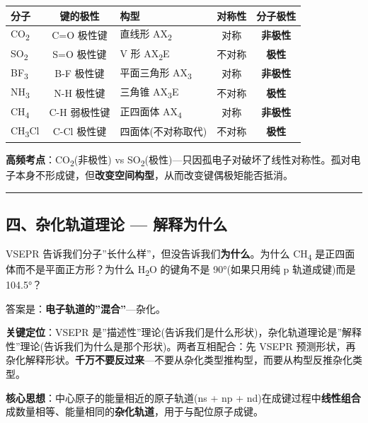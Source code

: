 \documentclass[a4paper,11pt]{ctexart}
\newcounter{none}
\newcommand{\箭}{\ensuremath{\rightarrow}}
\newcommand{\左箭}{\ensuremath{\leftarrow}}
\newcommand{\上箭}{\ensuremath{\uparrow}}
\newcommand{\下箭}{\ensuremath{\downarrow}}
\newcommand{\衡}{\ensuremath{\rightleftharpoons}}
\newcommand{\双箭}{\ensuremath{\leftrightarrow}}
\newcommand{\约等于}{\ensuremath{\approx}}
\newcommand{\小于等于}{\ensuremath{\leq}}
\newcommand{\大于等于}{\ensuremath{\geq}}
\newcommand{\不等于}{\ensuremath{\neq}}
\newcommand{\西格马}{\ensuremath{\sigma}}
\newcommand{\派}{\ensuremath{\pi}}
\begin{document}
{\def\LTcaptype{none} %
\begin{longtable}[]{@{}lclcc@{}}
\toprule\noalign{}
分子 & 键的极性 & 构型 & 对称性 & 分子极性 \\
\midrule\noalign{}
\endhead
\bottomrule\noalign{}
\endlastfoot
CO\textsubscript{2} & C=O 极性键 & 直线形 AX\textsubscript{2} & 对称 & \textbf{非极性} \\
SO\textsubscript{2} & S=O 极性键 & V 形 AX\textsubscript{2}E & 不对称 & \textbf{极性} \\
BF\textsubscript{3} & B-F 极性键 & 平面三角形 AX\textsubscript{3} & 对称 & \textbf{非极性} \\
NH\textsubscript{3} & N-H 极性键 & 三角锥 AX\textsubscript{3}E & 不对称 & \textbf{极性} \\
CH\textsubscript{4} & C-H 弱极性键 & 正四面体 AX\textsubscript{4} & 对称 & \textbf{非极性} \\
CH\textsubscript{3}Cl & C-Cl 极性键 & 四面体(不对称取代) & 不对称 & \textbf{极性} \\
\end{longtable}
}

\textbf{高频考点}：CO\textsubscript{2}(非极性) vs SO\textsubscript{2}(极性)---只因孤电子对破坏了线性对称性。孤对电子本身不形成键，但\textbf{改变空间构型}，从而改变键偶极矩能否抵消。

\begin{center}\rule{0.5\linewidth}{0.5pt}\end{center}

\subsection{四、杂化轨道理论 --- 解释为什么}\label{ux56dbux6742ux5316ux8f68ux9053ux7406ux8bba-ux89e3ux91caux4e3aux4ec0ux4e48}

VSEPR 告诉我们分子''长什么样''，但没告诉我们\textbf{为什么}。为什么 CH\textsubscript{4} 是正四面体而不是平面正方形？为什么 H\textsubscript{2}O 的键角不是 90°(如果只用纯 p 轨道成键)而是 104.5°？

答案是：\textbf{电子轨道的''混合''}---杂化。

\textbf{关键定位}：VSEPR 是''描述性''理论(告诉我们是什么形状)，杂化轨道理论是''解释性''理论(告诉我们为什么是那个形状)。两者互相配合：先 VSEPR 预测形状，再杂化解释形状。\textbf{千万不要反过来}---不要从杂化类型推构型，而要从构型反推杂化类型。

\textbf{核心思想}：中心原子的能量相近的原子轨道(ns + np + nd)在成键过程中\textbf{线性组合}成数量相等、能量相同的\textbf{杂化轨道}，用于与配位原子成键。
\end{document}
